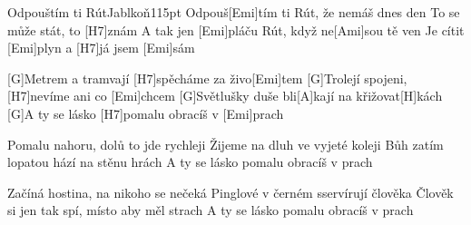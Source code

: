 \begin{song}{Odpouštím ti Rút}{Jablkoň}{115pt}
\chorus%
Odpouš[Emi]tím ti Rút, že nemáš dnes den
To se může stát, to [H7]znám
A tak jen [Emi]pláču Rút, když ne[Ami]sou tě ven
Je cítit [Emi]plyn a [H7]já jsem [Emi]sám

%
[G]Metrem a tramvají [H7]spěcháme za živo[Emi]tem
[G]Trolejí spojeni, [H7]nevíme ani co [Emi]chcem
[G]Světlušky duše bli[A]kají na křižovat[H]kách
\rl{}[G]A ty se lásko [H7]pomalu obracíš v [Emi]prach\rr{}
\repchor

%
Pomalu nahoru, dolů to jde rychleji
Žijeme na dluh ve vyjeté koleji
Bůh zatím lopatou hází na stěnu hrách
\rl{}A ty se lásko pomalu obracíš v prach\rr{}
\repchor

%
Začíná hostina, na nikoho se nečeká
Pinglové v černém sservírují člověka
Člověk si jen tak spí, místo aby měl strach
\rl{}A ty se lásko pomalu obracíš v prach
\end{song}
